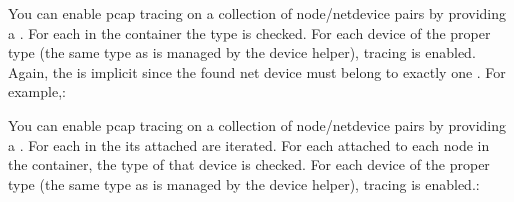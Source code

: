 \documentclass[letterpaper,10pt,english]{sphinxmanual}
\renewcommand{\sphinxcode}[1]{\texttt{\small{#1}}}
\begin{document}
\begin{sphinxVerbatim}[commandchars=\\\{\}]
  
  
  
\end{sphinxVerbatim}

You can enable pcap tracing on a collection of node/net\sphinxhyphen{}device pairs by
providing a \sphinxcode{}. For each \sphinxcode{} in the container the
type is checked.  For each device of the proper type (the same type as is
managed by the device helper), tracing is enabled. Again, the \sphinxcode{} is
implicit since the found net device must belong to exactly one \sphinxcode{}. For
example,:

\begin{sphinxVerbatim}[commandchars=\\\{\}]
   
  
\end{sphinxVerbatim}

You can enable pcap tracing on a collection of node/net\sphinxhyphen{}device pairs by
providing a \sphinxcode{}. For each \sphinxcode{} in the \sphinxcode{} its
attached \sphinxcode{} are iterated.  For each \sphinxcode{} attached to each
node in the container, the type of that device is checked.  For each device of
the proper type (the same type as is managed by the device helper), tracing is
enabled.:

\begin{sphinxVerbatim}[commandchars=\\\{\}]
 
  
\end{sphinxVerbatim}
\end{document}
